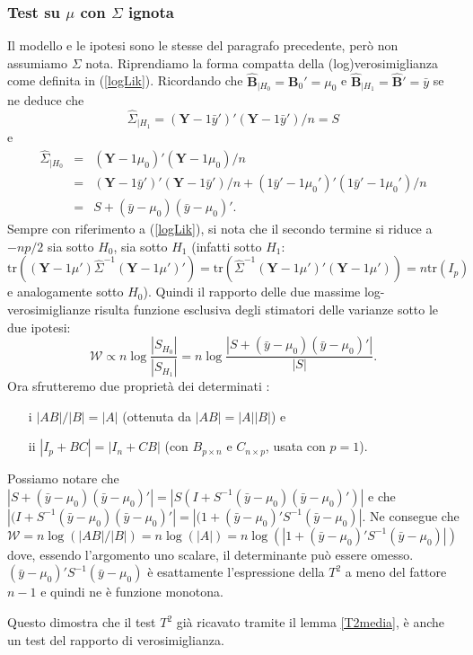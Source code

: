 \documentclass[10pt]{article}
\newcommand{\bfB}{\mathbf{B}}
\newcommand{\tr}{\mathrm{tr}}
\newcommand{\YY}{\mathbf{Y}}
\begin{document}
\subsubsection{Test su $\mu$ con $\Sigma$ ignota}\label{oneSample}
Il modello e le ipotesi sono le stesse del paragrafo precedente, però non assumiamo $\Sigma$ nota.
Riprendiamo la forma compatta della (log)verosimiglianza come definita in (\ref{logLik}).
Ricordando che $\hat{\bfB}_{|H_0}=\bfB_0'=\mu_0$ e  $\hat{\bfB}_{|H_1}=\hat{\bfB}'=\bar{y}$ 
se ne deduce che 
$$\hat{\Sigma}_{|H_1}=(\YY-1\bar{y}')'(\YY-1\bar{y}')/n=S$$ e 
\begin{eqnarray*}
\hat{\Sigma}_{|H_0}&=&(\YY-1\mu_0)'(\YY-1\mu_0)/n\\
&=&(\YY-1\bar{y}')'(\YY-1\bar{y}')/n +(1\bar{y}'-1\mu_0')'(1\bar{y}'-1\mu_0')/n\\
&=&S+(\bar{y}-\mu_0)(\bar{y}-\mu_0)'.
 \end{eqnarray*}
Sempre con riferimento a (\ref{logLik}), si nota che il secondo termine si riduce a $-np/2$ sia sotto $H_0$, sia sotto $H_1$ (infatti sotto $H_1$: $\tr\left( (\YY-1\mu')\hat{\Sigma}^{-1}(\YY-1\mu')' \right)=
\tr\left( \hat{\Sigma}^{-1}(\YY-1\mu')'(\YY-1\mu') \right)=n\tr(I_p)$ e analogamente sotto $H_0$). 
Quindi il rapporto delle due massime log-verosimiglianze risulta funzione esclusiva degli stimatori delle varianze sotto le due ipotesi:
$$\mathcal{W}\propto n\log\frac{|S_{H_0}|}{|S_{H_1}|}=n\log\frac{|S+(\bar{y}-\mu_0)(\bar{y}-\mu_0)'|}{|S|}.$$
Ora sfrutteremo due proprietà dei determinati :
\begin{itemize}
\item[i ] $|AB|/|B|=|A|$ (ottenuta da $|AB|=|A||B|$) e 
\item[ii ] $|I_p+BC|=|I_n+CB|$ (con $B_{p\times n}$ e $C_{n\times p}$, usata con $p=1$).
\end{itemize}
Possiamo notare che $|S+(\bar{y}-\mu_0)(\bar{y}-\mu_0)'| =|S(I+S^{-1}(\bar{y}-\mu_0)(\bar{y}-\mu_0)')|$ e che 
$|(I+S^{-1}(\bar{y}-\mu_0)(\bar{y}-\mu_0)'|=|(1+(\bar{y}-\mu_0)'S^{-1}(\bar{y}-\mu_0)|$.
Ne consegue che 
$\mathcal{W}=n\log(|AB|/|B|)=n\log(|A|)=n\log(|1 + (\bar{y}-\mu_0)'S^{-1}(\bar{y}-\mu_0)|)$
 dove, essendo l'argomento uno scalare, il determinante può essere omesso.
$(\bar{y}-\mu_0)'S^{-1}(\bar{y}-\mu_0)$ è esattamente l'espressione della $T^2$ a meno del fattore $n-1$ e quindi ne è funzione monotona.

Questo dimostra che il test $T^2$ già ricavato tramite il lemma \ref{T2media}, è anche un test del rapporto di verosimiglianza.
\end{document}
